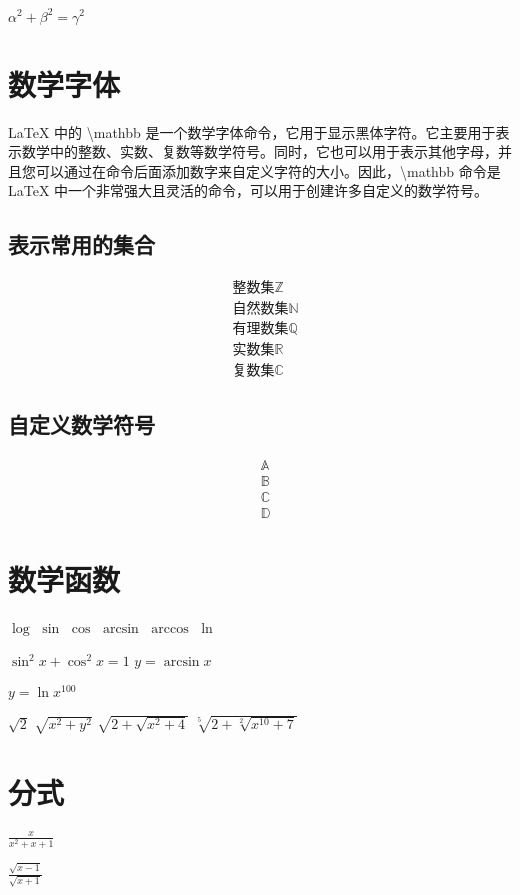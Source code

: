 \documentclass{article}
\begin{document}
	$\alpha^2 + \beta^2 = \gamma^2$
	
	\section{数学字体}
	LaTeX 中的 \textbackslash mathbb 是一个数学字体命令，它用于显示黑体字符。它主要用于表示数学中的整数、实数、复数等数学符号。同时，它也可以用于表示其他字母，并且您可以通过在命令后面添加数字来自定义字符的大小。因此，\textbackslash mathbb 命令是 LaTeX 中一个非常强大且灵活的命令，可以用于创建许多自定义的数学符号。
    
    \subsection{表示常用的集合}
   	\begin{align*}
   		&\text{整数集} \mathbb{Z} \\
   		&\text{自然数集} \mathbb{N} \\
   		&\text{有理数集} \mathbb{Q} \\
   		&\text{实数集} \mathbb{R} \\
   		&\text{复数集} \mathbb{C} 
   	\end{align*}
    \subsection{自定义数学符号}
    \begin{align*}
		& \mathbb{A} \\
		& \mathbb{B} \\
		& \mathbb{C} \\
		& \mathbb{D} 
    \end{align*}

	\section{数学函数}
	$\log$
	$\sin$
	$\cos$
	$\arcsin$
	$\arccos$
	$\ln$
	
	$\sin^2 x + \cos^2 x = 1$
	$y = \arcsin x$
	
	$y = \ln x^{100}$
	
	$\sqrt{2}$
	$\sqrt{x^2 + y^2}$
	$\sqrt{2 + \sqrt{x^2 + 4}}$
	$\sqrt[5]{2 + \sqrt[2]{x^{10}+7}}$
	\section{分式}
	$\frac{x}{x^2+x+1}$
	
	$\frac{\sqrt{x-1}}{\sqrt{x+1}}$
	
\end{document}
